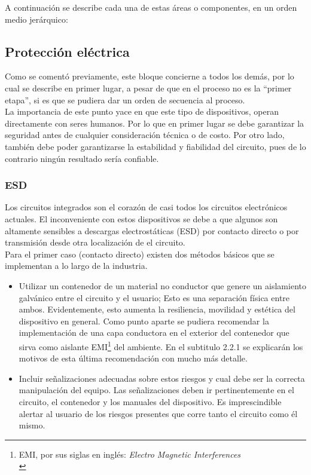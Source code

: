 A continuación se describe cada una de estas áreas o componentes, en un orden medio jerárquico:\\

\subsection{Protección eléctrica}
\label{sec:org9805377}
Como se comentó previamente, este bloque concierne a todos los demás, por lo cual se describe en primer lugar, a pesar de que en el proceso no es la “primer etapa”, si es que se pudiera dar un orden de secuencia al proceso.\\

La importancia de este punto yace en que este tipo de dispositivos, operan directamente con seres humanos. Por lo que en primer lugar se debe garantizar la seguridad antes de cualquier consideración técnica o de costo. Por otro lado, también debe poder garantizarse la estabilidad y fiabilidad del circuito, pues de lo contrario ningún resultado sería confiable.\\

\subsubsection{ESD}
\label{sec:org73b57f2}
Los circuitos integrados son el corazón de casi todos los circuitos electrónicos actuales. El inconveniente con estos dispositivos se debe a que algunos son altamente sensibles a descargas electrostáticas (ESD) por contacto directo o por transmisión desde otra localización de el circuito.\\

Para el primer caso (contacto directo) existen dos métodos básicos que se implementan a lo largo de la industria.\\

\begin{itemize}
\item Utilizar un contenedor de un material no conductor que genere un aislamiento galvánico entre el circuito y el usuario; Esto es una separación física entre ambos. Evidentemente, esto aumenta la resiliencia, movilidad y estética del dispositivo en general. Como punto aparte se pudiera recomendar la implementación de una capa conductora en el exterior del contenedor que sirva como aislante EMI\footnote{EMI, por sus siglas en inglés: \emph{Electro Magnetic Interferences}\\} del ambiente. En el subtitulo 2.2.1 se explicarán los motivos de esta última recomendación con mucho más detalle.\\

\item Incluir señalizaciones adecuadas sobre estos riesgos y cual debe ser la correcta manipulación del equipo. Las señalizaciones deben ir pertinentemente en el circuito, el contenedor y los manuales del dispositivo. Es imprescindible alertar al usuario de los riesgos presentes que corre tanto el circuito como él mismo.\\
\end{itemize}

